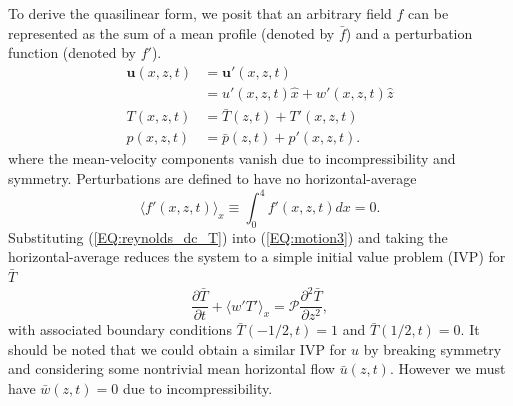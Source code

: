 \documentclass[reprint,amsmath,amssymb,aps]{revtex4-1}
\newcommand{\eq}[1]{(\ref{#1})}
\begin{document}
To derive the quasilinear form, we posit that an arbitrary field $f$ can be represented as the sum of a mean profile (denoted by $\bar{f}$) and a perturbation function (denoted by $f'$).
\begin{align}
    \mathbf{u}(x, z, t) &= \mathbf{u'}(x, z, t) \label{EQ:reynolds_dc_u}\\
    &= u'(x, z, t)\hat{x} + w'(x, z, t)\hat{z} \\
    T(x, z, t) &= \bar{T}(z, t) + T'(x, z, t) \label{EQ:reynolds_dc_T}\\
    p(x, z, t) &= \bar{p}(z, t) +  p'(x, z, t) \label{EQ:reynolds_dc_p}.
\end{align}
where the mean-velocity components vanish due to incompressibility and symmetry. Perturbations are defined to have no horizontal-average
\begin{equation}
    \langle f'(x, z, t) \rangle_x \equiv \int_{0}^4 f'(x, z, t) dx = 0.
\end{equation}
Substituting \eq{EQ:reynolds_dc_T} into \eq{EQ:motion3} and taking the horizontal-average reduces the system to a simple initial value problem (IVP) for $\bar{T}$
\begin{equation}
  \frac{\partial \bar{T}}{\partial t} + \langle w'T' \rangle_x = \mathcal{P}  \frac{\partial^2 \bar{T}}{\partial z^2}, \label{EQ:T0_IVP}
\end{equation}
with associated boundary conditions $\bar{T}(-1/2, t) = 1$ and $\bar{T}(1/2, t) = 0$. It should be noted that we could obtain a similar IVP for $u$ by breaking symmetry and considering some nontrivial mean horizontal flow $\bar{u}(z, t)$. However we must have $\bar{w}(z, t) = 0$ due to incompressibility.
\end{document}
